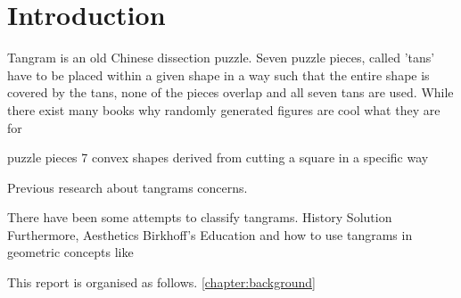 \chapter{Introduction}\label{chapter:introduction}

Tangram is an old Chinese dissection puzzle. Seven puzzle pieces, called 'tans' have to be placed within a given shape in a way such that the entire shape is covered by the tans, none of the pieces overlap and all seven tans are used.
 While there exist many books 
why randomly generated figures are cool
what they are for

puzzle pieces 7 convex shapes derived from cutting a square in a specific way

\missingfigure{}
Previous research about tangrams concerns. 

There have been some attempts to classify tangrams. 
History
Solution
Furthermore, 
Aesthetics 
Birkhoff's 
Education and how to use tangrams in geometric concepts like 

This report is organised as follows. \autoref{chapter:background}

